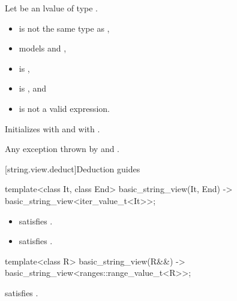 \begin{itemdescr}
\pnum
Let  be an lvalue of type .

\pnum
\constraints
\begin{itemize}
\item
{} is not the same type as ,
\item
{} models
 and ,
\item
{} is ,
\item
{} is , and
\item
{}
is not a valid expression.
\end{itemize}

\pnum
\effects
Initializes  with  and
 with .

\pnum
\throws
Any exception thrown by  and .
\end{itemdescr}

[string.view.deduct]{Deduction guides}

\begin{itemdecl}
template<class It, class End>
  basic_string_view(It, End) -> basic_string_view<iter_value_t<It>>;
\end{itemdecl}

\begin{itemdescr}
\pnum
\constraints
\begin{itemize}
\item {} satisfies .
\item {} satisfies .
\end{itemize}
\end{itemdescr}

\begin{itemdecl}
template<class R>
  basic_string_view(R&&) -> basic_string_view<ranges::range_value_t<R>>;
\end{itemdecl}

\begin{itemdescr}
\pnum
\constraints
{} satisfies .
\end{itemdescr}

